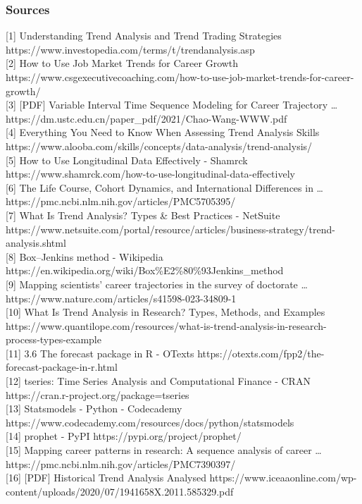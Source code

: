 \documentclass[./main.tex]{subfiles}
\begin{document}
\subsubsection{Sources}\label{sources}

{[}1{]} Understanding Trend Analysis and Trend Trading Strategies
https://www.investopedia.com/terms/t/trendanalysis.asp\\
{[}2{]} How to Use Job Market Trends for Career Growth
https://www.csgexecutivecoaching.com/how-to-use-job-market-trends-for-career-growth/\\
{[}3{]} {[}PDF{]} Variable Interval Time Sequence Modeling for Career
Trajectory \ldots{}
https://dm.ustc.edu.cn/paper\_pdf/2021/Chao-Wang-WWW.pdf\\
{[}4{]} Everything You Need to Know When Assessing Trend Analysis Skills
https://www.alooba.com/skills/concepts/data-analysis/trend-analysis/\\
{[}5{]} How to Use Longitudinal Data Effectively - Shamrck
https://www.shamrck.com/how-to-use-longitudinal-data-effectively\\
{[}6{]} The Life Course, Cohort Dynamics, and International Differences
in \ldots{} https://pmc.ncbi.nlm.nih.gov/articles/PMC5705395/\\
{[}7{]} What Is Trend Analysis? Types \& Best Practices - NetSuite
https://www.netsuite.com/portal/resource/articles/business-strategy/trend-analysis.shtml\\
{[}8{]} Box--Jenkins method - Wikipedia
https://en.wikipedia.org/wiki/Box\%E2\%80\%93Jenkins\_method\\
{[}9{]} Mapping scientists' career trajectories in the survey of
doctorate \ldots{} https://www.nature.com/articles/s41598-023-34809-1\\
{[}10{]} What Is Trend Analysis in Research? Types, Methods, and
Examples
https://www.quantilope.com/resources/what-is-trend-analysis-in-research-process-types-example\\
{[}11{]} 3.6 The forecast package in R - OTexts
https://otexts.com/fpp2/the-forecast-package-in-r.html\\
{[}12{]} tseries: Time Series Analysis and Computational Finance - CRAN
https://cran.r-project.org/package=tseries\\
{[}13{]} Statsmodels - Python - Codecademy
https://www.codecademy.com/resources/docs/python/statsmodels\\
{[}14{]} prophet - PyPI https://pypi.org/project/prophet/\\
{[}15{]} Mapping career patterns in research: A sequence analysis of
career \ldots{} https://pmc.ncbi.nlm.nih.gov/articles/PMC7390397/\\
{[}16{]} {[}PDF{]} Historical Trend Analysis Analysed
https://www.iceaaonline.com/wp-content/uploads/2020/07/1941658X.2011.585329.pdf\\
\end{document}
